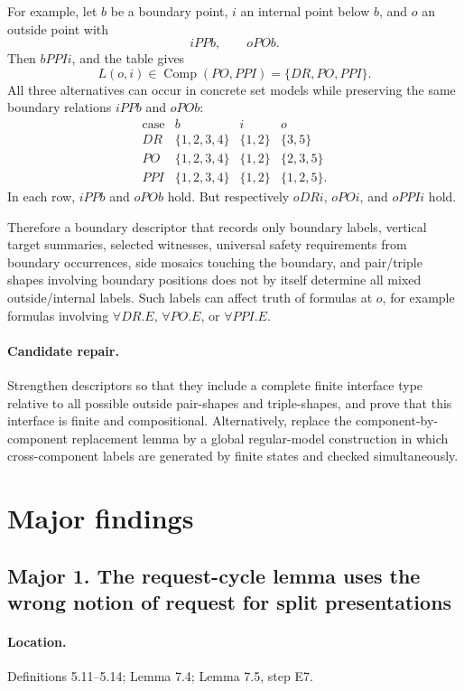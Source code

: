 \documentclass[11pt]{article}
\newcommand{\Comp}{\operatorname{Comp}}
\begin{document}
For example, let $b$ be a boundary point, $i$ an internal point below $b$, and $o$ an outside point with
\[
  iPPb,
  \qquad oPOb.
\]
Then $bPPIi$, and the table gives
\[
  L(o,i)\in \Comp(PO,PPI)=\{DR,PO,PPI\}.
\]
All three alternatives can occur in concrete set models while preserving the same boundary relations $iPPb$ and $oPOb$:
\[
\begin{array}{c|c|c|c}
\text{case} & b & i & o \\
\hline
DR  & \{1,2,3,4\} & \{1,2\} & \{3,5\} \\
PO  & \{1,2,3,4\} & \{1,2\} & \{2,3,5\} \\
PPI & \{1,2,3,4\} & \{1,2\} & \{1,2,5\}.
\end{array}
\]
In each row, $iPPb$ and $oPOb$ hold. But respectively $oDRi$, $oPOi$, and $oPPIi$ hold.

Therefore a boundary descriptor that records only boundary labels, vertical target summaries, selected witnesses, universal safety requirements from boundary occurrences, side mosaics touching the boundary, and pair/triple shapes involving boundary positions does not by itself determine all mixed outside/internal labels. Such labels can affect truth of formulas at $o$, for example formulas involving $\forall DR.E$, $\forall PO.E$, or $\forall PPI.E$.

\paragraph{Candidate repair.} Strengthen descriptors so that they include a complete finite interface type relative to all possible outside pair-shapes and triple-shapes, and prove that this interface is finite and compositional. Alternatively, replace the component-by-component replacement lemma by a global regular-model construction in which cross-component labels are generated by finite states and checked simultaneously.

\section{Major findings}

\subsection*{Major 1. The request-cycle lemma uses the wrong notion of request for split presentations}

\paragraph{Location.} Definitions 5.11--5.14; Lemma 7.4; Lemma 7.5, step E7.
\end{document}
